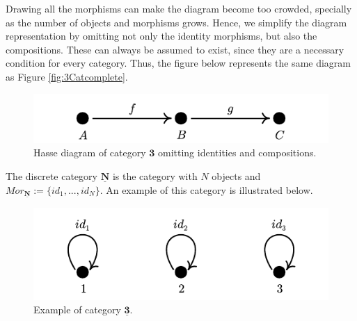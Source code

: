 \begin{example}
	Drawing all the morphisms can make the diagram become too crowded, specially
	as the number of objects and morphisms grows. Hence, we simplify the
	diagram representation by omitting not only the identity morphisms, but also
	the compositions. These can always be assumed to exist, since they are a necessary
	condition for every category.
	Thus, the figure below represents the same diagram as Figure \ref{fig:3Catcomplete}.

	\begin{figure}[H]
		\begin{center}
			\includegraphics{./notebooks/3Catsimple}
		\end{center}
		\caption{Hasse diagram of category $\bm 3$ omitting identities and compositions.}
		\label{fig:3Catsimple}
	\end{figure}

\end{example}

\begin{example}
	The discrete category $\mathbf{\underline{N}}$ is the category with $N$ objects
	and $Mor_{\mathbf{\underline{N}}} := \{id_1,...,id_N\}$. An example of this category is
	illustrated below.

	\begin{figure}[H]
		\begin{center}
			\includegraphics{./notebooks/3Discrete.pdf}
		\end{center}
		\caption{Example of category $\mathbf{\underline{3}}$.}
		\label{fig:3Discrete}
	\end{figure}
\end{example}

